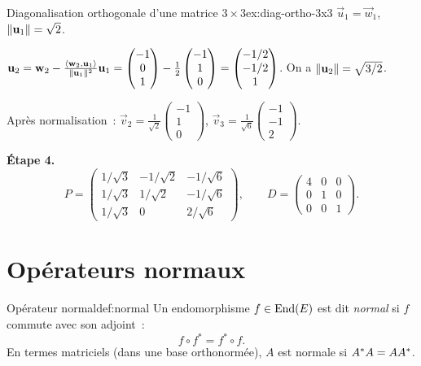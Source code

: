 \begin{example}{Diagonalisation orthogonale d'une matrice $3 \times 3$}{ex:diag-ortho-3x3}
  $\vec{u}_1 = \vec{w}_1$, $\lVert\mathbf{u}_1\rVert = \sqrt{2}$.

  $\mathbf{u}_2 = \mathbf{w}_2 - \frac{\langle\mathbf{w}_2, \mathbf{u}_1\rangle}{\lVert\mathbf{u}_1\rVert^2}\mathbf{u}_1
  = \begin{pmatrix} -1 \\ 0 \\ 1 \end{pmatrix}
  - \frac{1}{2}\begin{pmatrix} -1 \\ 1 \\ 0 \end{pmatrix}
  = \begin{pmatrix} -1/2 \\ -1/2 \\ 1 \end{pmatrix}$.
  On a $\lVert\mathbf{u}_2\rVert = \sqrt{3/2}$.

  Après normalisation~:
  $\vec{v}_2 = \frac{1}{\sqrt{2}}\begin{pmatrix} -1 \\ 1 \\ 0 \end{pmatrix}$,
  $\vec{v}_3 = \frac{1}{\sqrt{6}}\begin{pmatrix} -1 \\ -1 \\ 2 \end{pmatrix}$.

  \textbf{Étape 4.}
  \[
    P = \begin{pmatrix}
      1/\sqrt{3} & -1/\sqrt{2} & -1/\sqrt{6} \\
      1/\sqrt{3} & 1/\sqrt{2}  & -1/\sqrt{6} \\
      1/\sqrt{3} & 0           & 2/\sqrt{6}
    \end{pmatrix}, \qquad
    D = \begin{pmatrix} 4 & 0 & 0 \\ 0 & 1 & 0 \\ 0 & 0 & 1 \end{pmatrix}.
  \]
\end{example}

\section{Opérateurs normaux}\label{sec:normaux}

\begin{definition}{Opérateur normal}{def:normal}
  Un endomorphisme $f \in \operatorname{End}(E)$ est dit
  \emph{normal} si $f$ commute avec son adjoint~:
  \[
    f \circ f^* = f^* \circ f.
  \]
  En termes matriciels (dans une base orthonormée), $A$ est
  normale si ${A}^{*}A = A{A}^{*}$.
\end{definition}

